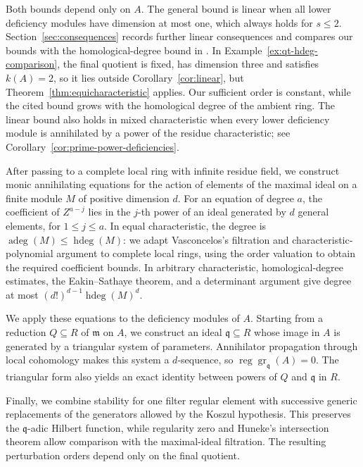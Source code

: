 \documentclass[11pt,reqno]{amsart}
\numberwithin{equation}{section}
\theoremstyle{definition}
\newcommand{\m}{\mathfrak m}
\newcommand{\q}{\mathfrak q}
\newcommand{\hdeg}{\operatorname{hdeg}}
\newcommand{\adeg}{\operatorname{adeg}}
\begin{document}
Both bounds depend only on $A$. The general bound is linear when
all lower deficiency modules have dimension at most one, which
always holds for $s\leq2$. Section~\ref{sec:consequences} records
further linear consequences and compares our bounds with the
homological-degree bound in \cite[Theorem~4.5]{QT}. In Example~\ref{ex:qt-hdeg-comparison},
the final quotient is fixed, has dimension three and satisfies
$k(A)=2$, so it lies outside Corollary~\ref{cor:linear}, but
Theorem~\ref{thm:equicharacteristic} applies. Our sufficient order
is constant, while the cited bound grows with the homological
degree of the ambient ring.
The linear bound also holds in mixed characteristic when every lower
deficiency module is annihilated by a power of the residue characteristic;
see Corollary~\ref{cor:prime-power-deficiencies}.

After passing to a complete local ring with infinite residue field,
we construct monic annihilating equations for the action of elements
of the maximal ideal on a finite module $M$ of positive dimension $d$.
For an equation of degree $a$, the coefficient of $Z^{a-j}$
lies in the $j$-th power of an ideal generated by $d$ general
elements, for $1\le j\le a$. In equal characteristic, the degree
is $\adeg(M)\le\hdeg(M)$: we adapt Vasconcelos's filtration and
characteristic-polynomial argument
\cite[Proposition~6 and Theorem~7]{Vasconcelos1996}
to complete local rings, using the order valuation to obtain the
required coefficient bounds. In arbitrary characteristic,
homological-degree estimates, the Eakin--Sathaye theorem, and a
determinant argument give degree at most $(d!)^{d-1}\hdeg(M)^d$.

We apply these equations to the deficiency modules of $A$.
Starting from a reduction $Q\subseteq R$ of $\m$ on $A$, we
construct an ideal $\q\subseteq R$ whose image in $A$ is generated
by a triangular system of parameters. Annihilator propagation through
local cohomology makes this system a $d$-sequence, so
$\operatorname{reg}\operatorname{gr}_{\q}(A)=0$.
The triangular form also yields an exact identity between powers
of $Q$ and $\q$ in $R$.

Finally, we combine stability for one filter regular element with
successive generic replacements of the generators allowed by the
Koszul hypothesis. This preserves the $\q$-adic Hilbert function,
while regularity zero and Huneke's intersection theorem allow
comparison with the maximal-ideal filtration. The resulting
perturbation orders depend only on the final quotient.
\end{document}
